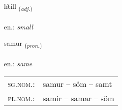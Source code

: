 \documentclass[frontgrid, backgrid]{flacards}\usepackage[]{graphicx}\usepackage[]{xcolor}
\begin{document}
\renewcommand{\flhead}{\vskip5pt \fboxsep=0pt {\small\bfseries\footnotesize Lýsingarorð | Adjective}}
\renewcommand{\fcfoot}{\vskip5pt \fboxsep=0pt \hspace{2pt}{\small\bfseries\footnotesize 1K}}

\renewcommand{\blhead}{\vskip5pt {\small\bfseries\footnotesize Lýsingarorð | Adjective }}
\renewcommand{\bcfoot}{\vskip5pt \hspace{2pt}{\small\bfseries\footnotesize 1K}}


{lítill \small{\textsubscript{(\textit{adj.})}} \\[1ex] %
\textphonetic{[liːtɪtl̥]} \\
en.: \emph{small} \\  [2ex]
\renewcommand*{\arraystretch}{0.8}
}

\renewcommand{\flhead}{\vskip5pt \fboxsep=0pt {\small\bfseries\footnotesize Fornafn | Pronoun}}
\renewcommand{\fcfoot}{\vskip5pt \fboxsep=0pt \hspace{2pt}{\small\bfseries\footnotesize 1K}}

\renewcommand{\blhead}{\vskip5pt {\small\bfseries\footnotesize Fornafn | Pronoun }}
\renewcommand{\bcfoot}{\vskip5pt \hspace{2pt}{\small\bfseries\footnotesize 1K}}


{samur \small{\textsubscript{(\textit{pron.})}} \\[1ex] %
\textphonetic{[saːmʏr]} \\
en.: \emph{same} \\  [2ex]
\renewcommand*{\arraystretch}{0.8}
\begin{tabular}{ll}
\textsc{sg.nom.}: & samur  --  söm -- samt \\ 
\textsc{pl.nom.}: & samir -- samar -- söm
\end{tabular}
}
\end{document}
